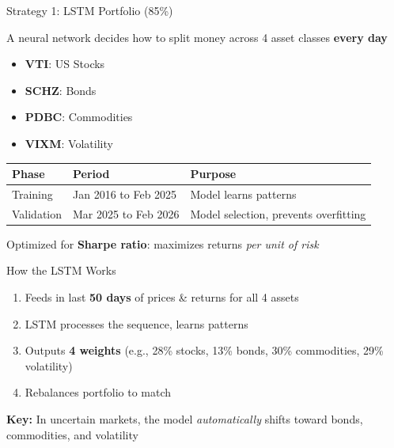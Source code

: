 \documentclass[aspectratio=169]{beamer}
\begin{document}
\begin{frame}{Strategy 1: LSTM Portfolio (85\%)}

\Large
A neural network decides how to split money across 4 asset classes \textbf{every day}

\vspace{0.3cm}

\large
\begin{itemize}
    \item \textbf{VTI}: US Stocks
    \item \textbf{SCHZ}: Bonds
    \item \textbf{PDBC}: Commodities
    \item \textbf{VIXM}: Volatility
\end{itemize}

\vspace{0.3cm}

\begin{table}
\centering
\begin{tabular}{lll}
\toprule
\textbf{Phase} & \textbf{Period} & \textbf{Purpose} \\
\midrule
Training & Jan 2016 to Feb 2025 & Model learns patterns \\
Validation & Mar 2025 to Feb 2026 & Model selection, prevents overfitting \\
\bottomrule
\end{tabular}
\end{table}

Optimized for \textbf{Sharpe ratio}: maximizes returns \textit{per unit of risk}

\end{frame}

\begin{frame}{How the LSTM Works}

\large
\begin{enumerate}
    \item Feeds in last \textbf{50 days} of prices \& returns for all 4 assets
    \item LSTM processes the sequence, learns patterns
    \item Outputs \textbf{4 weights} (e.g., 28\% stocks, 13\% bonds, 30\% commodities, 29\% volatility)
    \item Rebalances portfolio to match
\end{enumerate}

\vspace{0.5cm}

\textbf{Key:} In uncertain markets, the model \textit{automatically} shifts toward bonds, commodities, and volatility

\end{frame}
\end{document}
